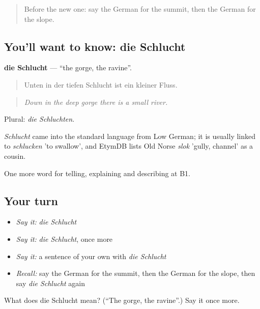 \label{lesson:GE-C453-schlucht}



\begin{quote}
Before the new one: say the German for the summit, then the German for the slope.
\end{quote}

\subsection*{You'll want to know: die Schlucht}
\textbf{die Schlucht} — \textquotedblleft{}the gorge, the ravine\textquotedblright{}.

\begin{quote}
Unten in der tiefen Schlucht ist ein kleiner Fluss.
\end{quote}

\begin{quote}
\emph{Down in the deep gorge there is a small river.}
\end{quote}

Plural: \emph{die Schluchten}.

\begin{cousinweb}
\emph{Schlucht} came into the standard language from Low German; it is usually linked to \emph{schlucken} 'to swallow', and EtymDB lists Old Norse \emph{slok} 'gully, channel' as a cousin.
\end{cousinweb}

\begin{grammarlens}[title={What you've built}]
One more word for telling, explaining and describing at B1.
\end{grammarlens}

\subsection*{Your turn}
\begin{itemize}
\raggedright
  \item \emph{Say it:} \emph{die Schlucht}
  \item \emph{Say it:} \emph{die Schlucht}, once more
  \item \emph{Say it:} a sentence of your own with \emph{die Schlucht}
  \item \emph{Recall:} say the German for the summit, then the German for the slope, then say \emph{die Schlucht} again
\end{itemize}

\begin{tcolorbox}[breakable,colback=teal!4,colframe=teal!35!black,title={Before you move on}]
What does die Schlucht mean? (\textquotedblleft{}The gorge, the ravine\textquotedblright{}.) Say it once more.
\end{tcolorbox}
